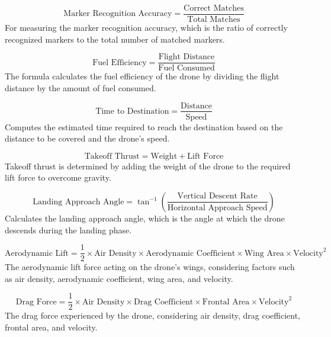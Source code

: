 \documentclass[preprint,12pt]{elsarticle}
\begin{document}
\begin{equation}
\text{Marker Recognition Accuracy} = \frac{\text{Correct Matches}}{\text{Total Matches}}
\end{equation}
For measuring the marker recognition accuracy, which is the ratio of correctly recognized markers to the total number of matched markers.

\begin{equation}
\text{Fuel Efficiency} = \frac{\text{Flight Distance}}{\text{Fuel Consumed}}
\end{equation}
The formula calculates the fuel efficiency of the drone by dividing the flight distance by the amount of fuel consumed.

\begin{equation}
\text{Time to Destination} = \frac{\text{Distance}}{\text{Speed}}
\end{equation}
Computes the estimated time required to reach the destination based on the distance to be covered and the drone's speed.

\begin{equation}
\text{Takeoff Thrust} = \text{Weight} + \text{Lift Force}
\end{equation}
Takeoff thrust is determined by adding the weight of the drone to the required lift force to overcome gravity.

\begin{equation}
\text{Landing Approach Angle} = \tan^{-1}\left(\frac{\text{Vertical Descent Rate}}{\text{Horizontal Approach Speed}}\right)
\end{equation}
Calculates the landing approach angle, which is the angle at which the drone descends during the landing phase.

\begin{equation}
\text{Aerodynamic Lift} = \frac{1}{2} \times \text{Air Density} \times \text{Aerodynamic Coefficient} \times \text{Wing Area} \times \text{Velocity}^2
\end{equation}
The aerodynamic lift force acting on the drone's wings, considering factors such as air density, aerodynamic coefficient, wing area, and velocity.

\begin{equation}
\text{Drag Force} = \frac{1}{2} \times \text{Air Density} \times \text{Drag Coefficient} \times \text{Frontal Area} \times \text{Velocity}^2
\end{equation}
The drag force experienced by the drone, considering air density, drag coefficient, frontal area, and velocity.
\end{document}
